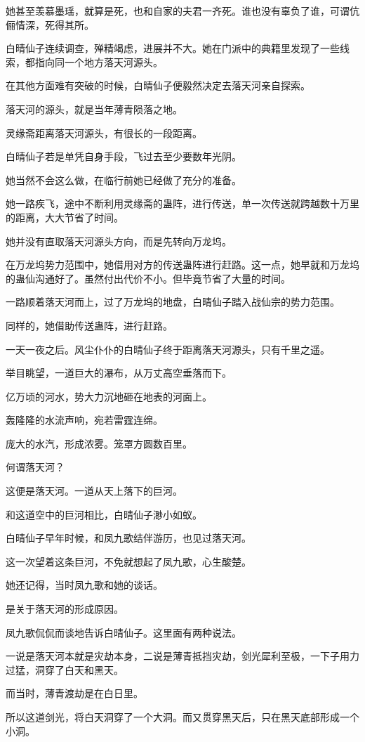 \begin{this_body}
她甚至羡慕墨瑶，就算是死，也和自家的夫君一齐死。谁也没有辜负了谁，可谓伉俪情深，死得其所。

白晴仙子连续调查，殚精竭虑，进展并不大。她在门派中的典籍里发现了一些线索，都指向同一个地方落天河源头。

在其他方面难有突破的时候，白晴仙子便毅然决定去落天河亲自探索。

落天河的源头，就是当年薄青陨落之地。

灵缘斋距离落天河源头，有很长的一段距离。

白晴仙子若是单凭自身手段，飞过去至少要数年光阴。

她当然不会这么做，在临行前她已经做了充分的准备。

她一路疾飞，途中不断利用灵缘斋的蛊阵，进行传送，单一次传送就跨越数十万里的距离，大大节省了时间。

她并没有直取落天河源头方向，而是先转向万龙坞。

在万龙坞势力范围中，她借用对方的传送蛊阵进行赶路。这一点，她早就和万龙坞的蛊仙沟通好了。虽然付出代价不小。但毕竟节省了大量的时间。

一路顺着落天河而上，过了万龙坞的地盘，白晴仙子踏入战仙宗的势力范围。

同样的，她借助传送蛊阵，进行赶路。

一天一夜之后。风尘仆仆的白晴仙子终于距离落天河源头，只有千里之遥。

举目眺望，一道巨大的瀑布，从万丈高空垂落而下。

亿万顷的河水，势大力沉地砸在地表的河面上。

轰隆隆的水流声响，宛若雷霆连绵。

庞大的水汽，形成浓雾。笼罩方圆数百里。

何谓落天河？

这便是落天河。一道从天上落下的巨河。

和这道空中的巨河相比，白晴仙子渺小如蚁。

白晴仙子早年时候，和凤九歌结伴游历，也见过落天河。

这一次望着这条巨河，不免就想起了凤九歌，心生酸楚。

她还记得，当时凤九歌和她的谈话。

是关于落天河的形成原因。

凤九歌侃侃而谈地告诉白晴仙子。这里面有两种说法。

一说是落天河本就是灾劫本身，二说是薄青抵挡灾劫，剑光犀利至极，一下子用力过猛，洞穿了白天和黑天。

而当时，薄青渡劫是在白日里。

所以这道剑光，将白天洞穿了一个大洞。而又贯穿黑天后，只在黑天底部形成一个小洞。


\end{this_body}
